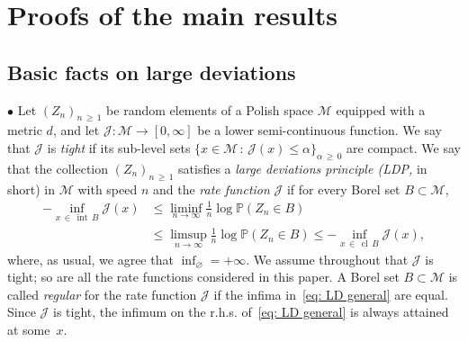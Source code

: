 \documentclass[AHL,Unicode,published]{cedram}
\DeclareMathOperator{\cl}{cl}
\DeclareMathOperator{\intr}{int}
\newcommand{\Pbb}{\mathbb{P}}
\newcommand{\Jcl}{\mathcal{J}}
\newcommand{\Mcl}{\mathcal{M}}
\begin{document}
\section{Proofs of the main results} \label{Sec: proof}
\subsection{Basic facts on large deviations} \label{Sec: basics on LDP}



$\bullet$ Let $(Z_n)_{n\,\ge\,1}$ be random elements of a Polish space $\Mcl$ equipped with a metric $d$, and let $\Jcl:\Mcl\to[0,\infty]$ be a lower semi-continuous function. We say that $\Jcl$ is \emph{tight} if its sub-level sets $\{x\in \Mcl \,:\, \Jcl(x) \leq \alpha \}_{\alpha\,\ge\,0}$ are compact. We say that the collection $(Z_n)_{n\,\ge\,1}$ satisfies a \emph{large deviations principle (LDP,} in short) in $\Mcl$ with speed $n$ and the \emph{rate function} $\Jcl$ if for every Borel set $B\subset \Mcl$,
\begin{equation}\label{eq: LD general}
\begin{aligned}
-\inf_{x\,\in\,\intr\,B}\Jcl(x) &\leq\liminf_{n\to\infty} \frac1n \log \Pbb\left(Z_n\in B\right) \\
&\leq\limsup_{n\to\infty} \frac1n \log \Pbb\left(Z_n\in B\right) \leq-\inf_{x\,\in\,\cl\,B}\Jcl(x),
\end{aligned}
\end{equation}
where, as usual, we agree that $\inf_\varnothing = +\infty$. We assume throughout that $\Jcl$ is tight; so are all the rate functions considered in this paper. A Borel set $B \subset \Mcl$ is called \emph{regular} for the rate function $\Jcl$ if the infima in~\eqref{eq: LD general} are equal. Since $\Jcl$ is tight, the infimum on the r.h.s. of~\eqref{eq: LD general} is always attained at some~$x$.
\end{document}
